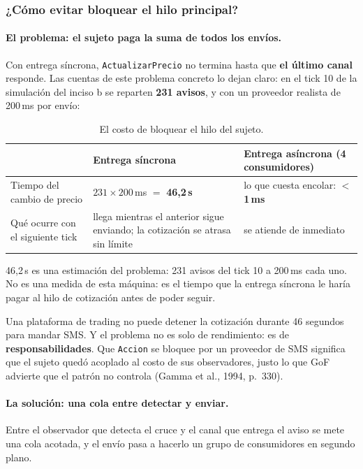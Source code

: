 \subsubsection{¿Cómo evitar bloquear el hilo principal?}

\paragraph{El problema: el sujeto paga la suma de todos los envíos.}
Con entrega síncrona, \texttt{ActualizarPrecio} no termina hasta que \textbf{el último
canal} responde. Las cuentas de este problema concreto lo dejan claro: en el tick 10 de la
simulación del inciso b se reparten \textbf{231 avisos}, y con un proveedor realista de
200\,ms por envío:

\begin{table}[H]
\centering
\small
\begin{tabularx}{\textwidth}{>{\raggedright\arraybackslash}p{4.2cm} >{\raggedright\arraybackslash}X >{\raggedright\arraybackslash}X}
\toprule
 & \textbf{Entrega síncrona} & \textbf{Entrega asíncrona (4 consumidores)} \\
\midrule
Tiempo del cambio de precio & $231 \times 200$\,ms $=$ \textbf{46,2\,s} & lo que cuesta encolar: \textbf{$<$ 1\,ms} \\
\addlinespace
Qué ocurre con el siguiente tick & llega mientras el anterior sigue enviando; la cotización se atrasa sin límite & se atiende de inmediato \\
\bottomrule
\end{tabularx}
\caption{El costo de bloquear el hilo del sujeto.}
\end{table}

46,2\,s es una estimación del problema: 231 avisos del tick 10 a 200\,ms cada uno. No es una medida de esta máquina: es el tiempo que la entrega síncrona le haría pagar al hilo de cotización antes de poder seguir.

Una plataforma de trading no puede detener la cotización durante 46 segundos para mandar
SMS. Y el problema no es solo de rendimiento: es de \textbf{responsabilidades}. Que
\texttt{Accion} se bloquee por un proveedor de SMS significa que el sujeto quedó acoplado al
costo de sus observadores, justo lo que GoF advierte que el patrón no controla
(Gamma et al., 1994, p.~330).

\paragraph{La solución: una cola entre detectar y enviar.}
Entre el observador que detecta el cruce y el canal que entrega el aviso se mete una cola
acotada, y el envío pasa a hacerlo un grupo de consumidores en segundo plano.

